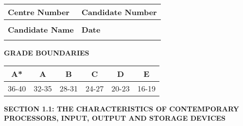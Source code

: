 \documentclass[11pt, a4paper]{article}
\begin{document}
\vspace{1cm}

\begin{tabular}{|p{4cm}|p{7cm}|}
\hline
\textbf{Centre Number} & \textbf{Candidate Number} \\
\hline
& \\
\hline
\textbf{Candidate Name} & \textbf{Date} \\
\hline
& \\
\hline
\end{tabular}

\vspace{0.5cm}

\begin{center}
\textbf{GRADE BOUNDARIES}

\begin{tabular}{|c|c|c|c|c|c|}
\hline
A* & A & B & C & D & E \\
\hline
36-40 & 32-35 & 28-31 & 24-27 & 20-23 & 16-19 \\
\hline
\end{tabular}
\end{center}

\newpage

\begin{center}
\textbf{SECTION 1.1: THE CHARACTERISTICS OF CONTEMPORARY PROCESSORS, INPUT, OUTPUT AND STORAGE DEVICES}
\end{center}
\end{document}

